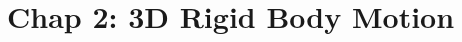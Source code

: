 \documentclass[main.tex]{subfiles}
\begin{document}
\newpage

\section{Chap 2: 3D Rigid Body Motion}
\end{document}
